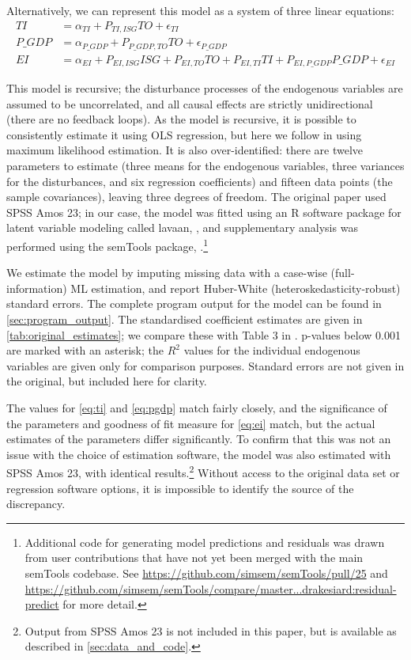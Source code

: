 \documentclass[11pt,a4paper]{article}
\newcommand{\pkg}[1]{{\fontseries{b}\selectfont #1}}
\begin{document}
Alternatively, we can represent this model as a system of three linear equations:
\begin{align}
TI &= \alpha_{TI} + P_{TI,ISG} TO + \epsilon_{TI} \label{eq:ti}\\
P\_GDP &= \alpha_{P\_GDP} + P_{P\_GDP,TO} TO + \epsilon_{P\_GDP} \label{eq:pgdp}\\
EI &= \alpha_{EI} + P_{EI,ISG} ISG + P_{EI,TO} TO + P_{EI,TI} TI + P_{EI,P\_GDP} P\_GDP + \epsilon_{EI} \label{eq:ei}
\end{align}

This model is recursive; the disturbance processes of the endogenous variables are assumed to be uncorrelated, and all causal effects are strictly unidirectional (there are no feedback loops).
As the model is recursive, it is possible to consistently estimate it using OLS regression, but here we follow \cite{panHowIndustrializationTrade2019} in using maximum likelihood estimation.
It is also over-identified: there are twelve parameters to estimate (three means for the endogenous variables, three variances for the disturbances, and six regression coefficients) and fifteen data points (the sample covariances), leaving three degrees of freedom.
The original paper used SPSS Amos 23; in our case, the model was fitted using an R software package for latent variable modeling called \pkg{lavaan}, \cite{rosseelLavaanPackageStructural2012}, and supplementary analysis was performed using the \pkg{semTools} package, \cite{jorgensenSemToolsUsefulTools2019}.\footnote{
Additional code for generating model predictions and residuals was drawn from user contributions that have not yet been merged with the main \pkg{semTools} codebase.
See \url{https://github.com/simsem/semTools/pull/25} and \url{https://github.com/simsem/semTools/compare/master...drakesiard:residual-predict} for more detail.
}

We estimate the model by imputing missing data with a case-wise (full-information) ML estimation, and report Huber-White (heteroskedasticity-robust) standard errors. 
The complete program output for the model can be found in \cref{sec:program_output}.
The standardised coefficient estimates are given in \cref{tab:original_estimates}; we compare these with Table 3 in \cite{panHowIndustrializationTrade2019}.
p-values below 0.001 are marked with an asterisk; the $R^{2}$ values for the individual endogenous variables are given only for comparison purposes.
Standard errors are not given in the original, but included here for clarity.

The values for \cref{eq:ti} and \cref{eq:pgdp} match fairly closely, and the significance of the parameters and goodness of fit measure for \cref{eq:ei} match, but the actual estimates of the parameters differ significantly.
To confirm that this was not an issue with the choice of estimation software, the model was also estimated with SPSS Amos 23, with identical results.\footnote{
Output from SPSS Amos 23 is not included in this paper, but is available as described in \cref{sec:data_and_code}.}
Without access to the original data set or regression software options, it is impossible to identify the source of the discrepancy.
\end{document}
